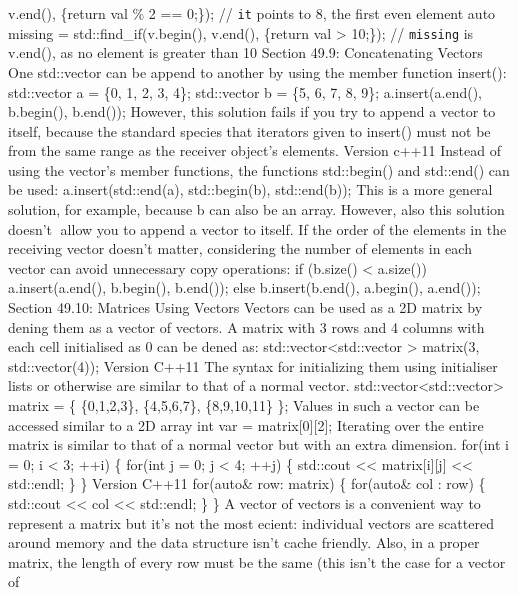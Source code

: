 v.end(), \href{int\%20val}{}\{return val \% 2 == 0;\}); //
\passthrough{\lstinline!it!} points to 8, the first even element auto
missing = std::find\_if(v.begin(), v.end(), \href{int\%20val}{}\{return
val \textgreater{} 10;\}); // \passthrough{\lstinline!missing!} is
v.end(), as no element is greater than 10 Section 49.9: Concatenating
Vectors One std::vector can be append to another by using the member
function insert(): std::vector a = \{0, 1, 2, 3, 4\}; std::vector b =
\{5, 6, 7, 8, 9\}; a.insert(a.end(), b.begin(), b.end()); However, this
solution fails if you try to append a vector to itself, because the
standard species that iterators given to insert() must not be from the
same range as the receiver object's elements. Version c++11 Instead of
using the vector's member functions, the functions std::begin() and
std::end() can be used: a.insert(std::end(a), std::begin(b),
std::end(b)); This is a more general solution, for example, because b
can also be an array. However, also this solution doesn't allow you to
append a vector to itself. If the order of the elements in the receiving
vector doesn't matter, considering the number of elements in each vector
can avoid unnecessary copy operations: if (b.size() \textless{}
a.size()) a.insert(a.end(), b.begin(), b.end()); else b.insert(b.end(),
a.begin(), a.end()); Section 49.10: Matrices Using Vectors Vectors can
be used as a 2D matrix by dening them as a vector of vectors. A matrix
with 3 rows and 4 columns with each cell initialised as 0 can be dened
as: std::vector\textless std::vector \textgreater{} matrix(3,
std::vector(4)); Version C++11 The syntax for initializing them using
initialiser lists or otherwise are similar to that of a normal vector.
std::vector\textless std::vector\textgreater{} matrix = \{ \{0,1,2,3\},
\{4,5,6,7\}, \{8,9,10,11\} \}; Values in such a vector can be accessed
similar to a 2D array int var = matrix{[}0{]}{[}2{]}; Iterating over the
entire matrix is similar to that of a normal vector but with an extra
dimension. for(int i = 0; i \textless{} 3; ++i) \{ for(int j = 0; j
\textless{} 4; ++j) \{ std::cout \textless\textless{}
matrix{[}i{]}{[}j{]} \textless\textless{} std::endl; \} \} Version C++11
for(auto\& row: matrix) \{ for(auto\& col : row) \{ std::cout
\textless\textless{} col \textless\textless{} std::endl; \} \} A vector
of vectors is a convenient way to represent a matrix but it's not the
most ecient: individual vectors are scattered around memory and the data
structure isn't cache friendly. Also, in a proper matrix, the length of
every row must be the same (this isn't the case for a vector of
